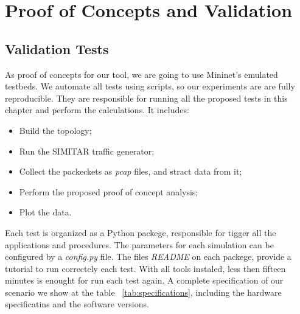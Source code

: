 \chapter{Proof of Concepts and Validation}\label{ch:validation}


\section{Validation Tests}


As proof of concepts for our tool, we are going to use Mininet's emulated testbeds. We automate all tests using scripts, so our experiments are are fully  reproducible. They are responsible for running all the proposed tests in this chapter and perform the calculations. It includes:

\begin{itemize}
	\item Build the topology;
	\item Run the SIMITAR traffic generator;
	\item Collect the packeckets as \textit{pcap} files, and stract data from it;
	\item Perform the proposed proof of concept analysis;
	\item Plot the data.
\end{itemize}

Each test is organized as a Python packege, responsible for tigger all the applications and procedures. The parameters for each simulation can be configured by a \textit{config.py} file. The files \textit{README} on each packege, provide a tutorial to run correctely each test. With all tools instaled, less then fifteen minutes is enought for run each test again. A complete specification of our scenario we show at the table ~\ref{tab:specifications}, including the hardware specificatins and the software versions. 

